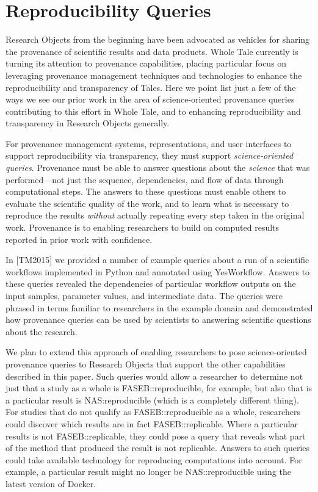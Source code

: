 \section{Reproducibility Queries}\label{sec-transparency}

Research Objects from the beginning have been advocated as vehicles for sharing the 
	provenance of scientific results and data products.
Whole Tale currently is turning its attention to provenance capabilities, placing particular
	focus on leveraging provenance management techniques and technologies
	to enhance the reproducibility and transparency of Tales.
Here we point list just a few of the ways we see our prior work in the area
	of science-oriented provenance queries contributing to this effort in Whole Tale,
	and to enhancing reproducibility and transparency in Research Objects generally.

For provenance management systems, representations, and user interfaces to support 
	reproducibility via transparency, they must support \emph{science-oriented queries}.
Provenance must be able to answer questions about the \emph{science} that was performed---not just the
	sequence, dependencies, and flow of data through computational steps.
The answers to these questions must enable others to evaluate the scientific quality of the work, 
	and to learn what is necessary to
	reproduce the results \emph{without} actually repeating every step taken in the original work.
Provenance is to enabling researchers to build on computed results reported in prior work with confidence.

In [TM2015] we provided a number of example queries about a run of a scientific
	workflows implemented in Python and annotated using YesWorkflow.
Answers to these queries revealed the dependencies of particular workflow outputs
	on the input samples, parameter values, and intermediate data.
The queries were phrased in terms familiar to researchers  in the example domain
	and demonstrated how provenance queries can be used by scientists
	to answering scientific questions about the research.

We plan to extend this approach of enabling researchers to pose science-oriented
	provenance queries to Research Objects that support the other capabilities
	described in this paper.
Such queries would allow a researcher to determine not just that a study as a whole
	is FASEB::reproducible, for example, but also that is a particular result
	is NAS:reproducible (which is a completely different thing).
For studies that do not qualify as FASEB::reproducible as a whole, researchers
	could discover which results are in fact FASEB::replicable.
Where a particular results is not FASEB::replicable, they could pose a query
	that reveals what part of the method that produced the result is 
	not replicable.
Answers to such queries could take available technology for reproducing computations
	into account.
For example, a particular result might no longer be NAS::reproducible using the
	latest version of Docker.


